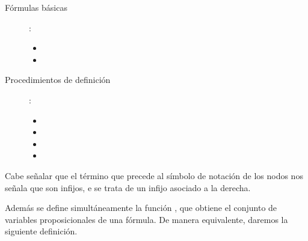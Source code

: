 \begin{isabellebody}
\begin{isamarkuptext}
  \begin{description}
    \item[Fórmulas básicas]:  
      \begin{itemize}
        \item {}
        \item {}
      \end{itemize}
    \item [Procedimientos de definición]:
      \begin{itemize}
        \item {}
        \item {}
        \item {}
        \item {}
      \end{itemize}
  \end{description}

  Cabe señalar que el término  que precede al símbolo de notación de los nodos nos señala que 
  son infijos, e  se trata de un infijo asociado a la derecha.

  Además se define simultáneamente la función , que obtiene el conjunto de 
  variables proposicionales de una fórmula. De manera equivalente, daremos la siguiente definición.


\end{isamarkuptext}
\end{isabellebody}
